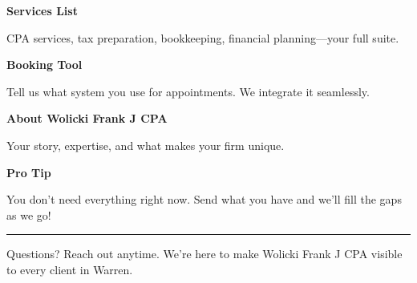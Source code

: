 \documentclass[11pt,letterpaper]{article}
\begin{document}
\begin{minipage}[t]{0.48\textwidth}
\begin{tcolorbox}[colframe=accent-teal, boxrule=1pt, left=0.7em, right=0.7em, top=0.5em, bottom=0.5em, arc=4pt, boxsep=0pt]
{\bfseries\small\color{accent-teal}Services List}

\vspace{0.15em}

{\small CPA services, tax preparation, bookkeeping, financial planning—your full suite.}
\end{tcolorbox}

\vspace{0.1em}

\begin{tcolorbox}[colframe=accent-teal, boxrule=1pt, left=0.7em, right=0.7em, top=0.5em, bottom=0.5em, arc=4pt, boxsep=0pt]
{\bfseries\small\color{accent-teal}Booking Tool}

\vspace{0.15em}

{\small Tell us what system you use for appointments. We integrate it seamlessly.}
\end{tcolorbox}

\vspace{0.1em}

\begin{tcolorbox}[colframe=accent-teal, boxrule=1pt, left=0.7em, right=0.7em, top=0.5em, bottom=0.5em, arc=4pt, boxsep=0pt]
{\bfseries\small\color{accent-teal}About Wolicki Frank J CPA}

\vspace{0.15em}

{\small Your story, expertise, and what makes your firm unique.}
\end{tcolorbox}

\vspace{-0.2em}
\end{minipage}

\vspace{0.15em}

\begin{tcolorbox}[colback={accent-red!5}, colframe=accent-red!20, boxrule=0.5pt, left=0.7em, right=0.7em, top=0.4em, bottom=0.4em, arc=6pt, boxsep=0pt]

{\bfseries\small\color{accent-red}Pro Tip}

\vspace{0.1em}

{\small You don't need everything right now. Send what you have and we'll fill the gaps as we go!}

\end{tcolorbox}

\vspace{0.15em}

\noindent\hrule
\vspace{0.2em}

{\small\color{text-light}Questions? Reach out anytime. We're here to make Wolicki Frank J CPA visible to every client in Warren.}
\end{document}
